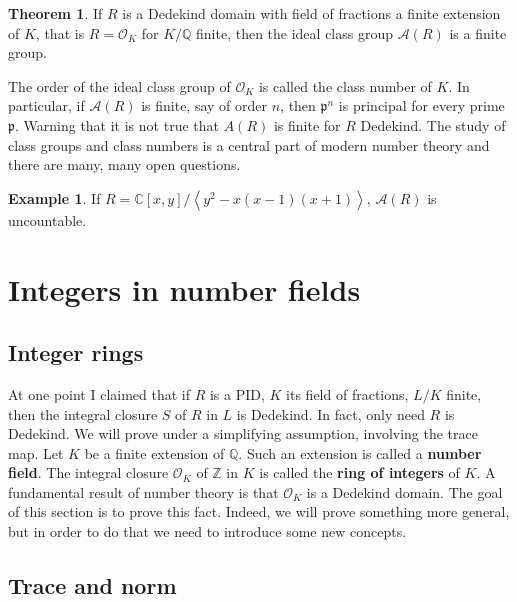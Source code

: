 \documentclass{article}
\newcommand{\Z}{\mathbb{Z}}
\newcommand{\Q}{\mathbb{Q}}
\newcommand{\C}{\mathbb{C}}
\newcommand{\rb}[1]{\left( #1 \right)}
\renewcommand{\sb}[1]{\left[ #1 \right]}
\newcommand{\ab}[1]{\left\langle #1 \right\rangle}
\theoremstyle{definition}\newtheorem{definition}{Definition}[subsection]
\theoremstyle{definition}\newtheorem{remark}[definition]{Remark}
\theoremstyle{definition}\newtheorem*{example}{Example}
\theoremstyle{definition}\newtheorem*{note}{Note}
\newtheorem{theorem}[definition]{Theorem}
\begin{document}
\begin{theorem}
If $ R $ is a Dedekind domain with field of fractions a finite extension of $ K $, that is $ R = \mathcal{O}_K $ for $ K / \Q $ finite, then the ideal class group $ \mathcal{A}\rb{R} $ is a finite group.
\end{theorem}

The order of the ideal class group of $ \mathcal{O}_K $ is called the class number of $ K $. In particular, if $ \mathcal{A}\rb{R} $ is finite, say of order $ n $, then $ \mathfrak{p}^n $ is principal for every prime $ \mathfrak{p} $. Warning that it is not true that $ A\rb{R} $ is finite for $ R $ Dedekind. The study of class groups and class numbers is a central part of modern number theory and there are many, many open questions.

\begin{example}
If $ R = \C\sb{x, y} / \ab{y^2 - x\rb{x - 1}\rb{x + 1}} $, $ \mathcal{A}\rb{R} $ is uncountable.
\end{example}

\section{Integers in number fields}

\subsection{Integer rings}

At one point I claimed that if $ R $ is a PID, $ K $ its field of fractions, $ L / K $ finite, then the integral closure $ S $ of $ R $ in $ L $ is Dedekind. In fact, only need $ R $ is Dedekind. We will prove under a simplifying assumption, involving the trace map. Let $ K $ be a finite extension of $ \Q $. Such an extension is called a \textbf{number field}. The integral closure $ \mathcal{O}_K $ of $ \Z $ in $ K $ is called the \textbf{ring of integers} of $ K $. A fundamental result of number theory is that $ \mathcal{O}_K $ is a Dedekind domain. The goal of this section is to prove this fact. Indeed, we will prove something more general, but in order to do that we need to introduce some new concepts.

\subsection{Trace and norm}
\end{document}
